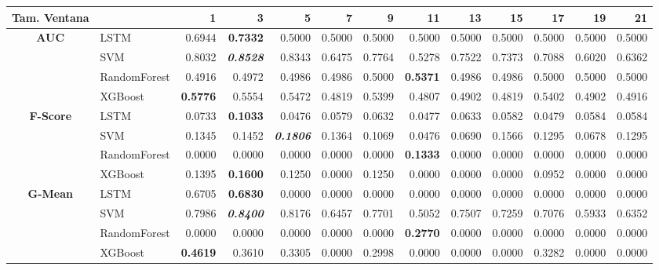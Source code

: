 \begin{table}[H]
	\centering
	\begin{adjustbox}{max width=14cm}
		\begin{tabular}{|c|l|r|r|r|r|r|r|r|r|r|r|r|}
			\hline
			\textbf{Tam. Ventana} &         &      1  &      3  &      5  &      7  &      9  &      11 &      13 &      15 &      17 &      19 &      21 \\
			\hline
			\textbf{AUC} &  LSTM &  0.6944 & \textbf{  0.7332 } &  0.5000 &  0.5000 &  0.5000 &  0.5000 &  0.5000 &  0.5000 &  0.5000 &  0.5000 &  0.5000 \\
			&  SVM &  0.8032 & \textit{ \textbf{  0.8528 } } &  0.8343 &  0.6475 &  0.7764 &  0.5278 &  0.7522 &  0.7373 &  0.7088 &  0.6020 &  0.6362 \\
			&  RandomForest &  0.4916 &  0.4972 &  0.4986 &  0.4986 &  0.5000 & \textbf{  0.5371 } &  0.4986 &  0.4986 &  0.5000 &  0.5000 &  0.5000 \\
			&  XGBoost & \textbf{  0.5776 } &  0.5554 &  0.5472 &  0.4819 &  0.5399 &  0.4807 &  0.4902 &  0.4819 &  0.5402 &  0.4902 &  0.4916 \\
			\hline
			\textbf{F-Score} &  LSTM &  0.0733 & \textbf{  0.1033 } &  0.0476 &  0.0579 &  0.0632 &  0.0477 &  0.0633 &  0.0582 &  0.0479 &  0.0584 &  0.0584 \\
			&  SVM &  0.1345 &  0.1452 & \textit{ \textbf{  0.1806 } } &  0.1364 &  0.1069 &  0.0476 &  0.0690 &  0.1566 &  0.1295 &  0.0678 &  0.1295 \\
			&  RandomForest &  0.0000 &  0.0000 &  0.0000 &  0.0000 &  0.0000 & \textbf{  0.1333 } &  0.0000 &  0.0000 &  0.0000 &  0.0000 &  0.0000 \\
			&  XGBoost &  0.1395 & \textbf{  0.1600 } &  0.1250 &  0.0000 &  0.1250 &  0.0000 &  0.0000 &  0.0000 &  0.0952 &  0.0000 &  0.0000 \\
			\hline
			\textbf{G-Mean} &  LSTM &  0.6705 & \textbf{  0.6830 } &  0.0000 &  0.0000 &  0.0000 &  0.0000 &  0.0000 &  0.0000 &  0.0000 &  0.0000 &  0.0000 \\
			&  SVM &  0.7986 & \textit{ \textbf{  0.8400 } } &  0.8176 &  0.6457 &  0.7701 &  0.5052 &  0.7507 &  0.7259 &  0.7076 &  0.5933 &  0.6352 \\
			&  RandomForest &  0.0000 &  0.0000 &  0.0000 &  0.0000 &  0.0000 & \textbf{  0.2770 } &  0.0000 &  0.0000 &  0.0000 &  0.0000 &  0.0000 \\
			&  XGBoost & \textbf{  0.4619 } &  0.3610 &  0.3305 &  0.0000 &  0.2998 &  0.0000 &  0.0000 &  0.0000 &  0.3282 &  0.0000 &  0.0000 \\

\end{tabular}
\end{adjustbox}
\end{table}
